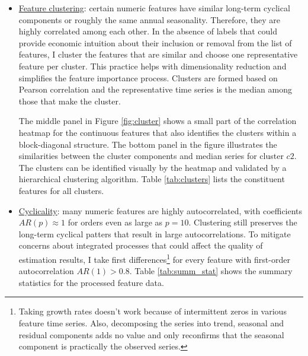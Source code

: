 \documentclass[12pt]{article}
\begin{document}
\begin{itemize}
	\item \underline{Feature clustering}: certain numeric features have similar long-term cyclical components or roughly the same annual seasonality. Therefore, they are highly correlated among each other. In the absence of labels that could provide economic intuition about their inclusion or removal from the list of features, I cluster the features that are similar and choose one representative feature per cluster. This practice helps with dimensionality reduction and simplifies the feature importance process. Clusters are formed based on Pearson correlation and the representative time series is the median among those that make the cluster. 
	
	The middle panel in Figure \ref{fig:cluster} shows a small part of the correlation heatmap for the continuous features that also identifies the clusters within a block-diagonal structure. The bottom panel in the figure illustrates the similarities between the cluster components and median series for cluster $c2$. The clusters can be identified visually by the heatmap and validated by a hierarchical clustering algorithm. Table \ref{tab:clusters} lists the constituent features for all clusters.
	\item \underline{Cyclicality}: many numeric features are highly autocorrelated, with coefficients $AR(p)\approx1$ for orders even as large as $p=10$. Clustering still preserves the long-term cyclical patters that result in large autocorrelations. To mitigate concerns about integrated processes that could affect the quality of estimation results, I take first differences\footnote{Taking growth rates doesn't work because of intermittent zeros in various feature time series. Also, decomposing the series into trend, seasonal and residual components adds no value and only reconfirms that the seasonal component is practically the observed series.} for every feature with first-order autocorrelation $AR(1) > 0.8$. Table \ref{tab:summ_stat} shows the summary statistics for the processed feature data. 
\end{itemize}

\clearpage

\end{document}
